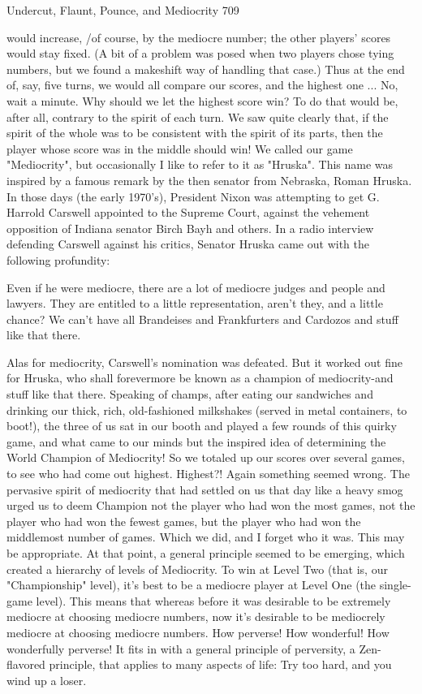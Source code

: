 Undercut, Flaunt, Pounce, and Mediocrity                                             709

would increase, /of course, by the mediocre number; the other players' scores would
stay fixed. (A bit of a problem was posed when two players chose tying numbers, but
we found a makeshift way of handling that case.)
        Thus at the end of, say, five turns, we would all compare our scores, and the
highest one ... No, wait a minute. Why should we let the highest score win? To do that
would be, after all, contrary to the spirit of each turn. We saw quite clearly that, if the
spirit of the whole was to be consistent with the spirit of its parts, then the player
whose score was in the middle should win! We called our game "Mediocrity", but
occasionally I like to refer to it as "Hruska".
        This name was inspired by a famous remark by the then senator from
Nebraska, Roman Hruska. In those days (the early 1970's), President Nixon was
attempting to get G. Harrold Carswell appointed to the Supreme Court, against the
vehement opposition of Indiana senator Birch Bayh and others. In a radio interview
defending Carswell against his critics, Senator Hruska came out with the following
profundity:

   Even if he were mediocre, there are a lot of mediocre judges and people and
   lawyers. They are entitled to a little representation, aren't they, and a little
   chance? We can't have all Brandeises and Frankfurters and Cardozos and stuff
   like that there.

         Alas for mediocrity, Carswell's nomination was defeated. But it worked out
fine for Hruska, who shall forevermore be known as a champion of mediocrity-and
stuff like that there.
         Speaking of champs, after eating our sandwiches and drinking our thick, rich,
old-fashioned milkshakes (served in metal containers, to boot!), the three of us sat in
our booth and played a few rounds of this quirky game, and what came to our minds
but the inspired idea of determining the World Champion of Mediocrity! So we
totaled up our scores over several games, to see who had come out highest. Highest?!
Again something seemed wrong. The pervasive spirit of mediocrity that had settled on
us that day like a heavy smog urged us to deem Champion not the player who had
won the most games, not the player who had won the fewest games, but the player
who had won the middlemost number of games. Which we did, and I forget who it
was. This may be appropriate.
         At that point, a general principle seemed to be emerging, which created a
hierarchy of levels of Mediocrity. To win at Level Two (that is, our "Championship"
level), it's best to be a mediocre player at Level One (the single-game level). This
means that whereas before it was desirable to be extremely mediocre at choosing
mediocre numbers, now it's desirable to be mediocrely mediocre at choosing
mediocre numbers. How perverse! How wonderful! How wonderfully perverse! It fits
in with a general principle of perversity, a Zen-flavored principle, that applies to
many aspects of life: Try too hard, and you wind up a loser.




